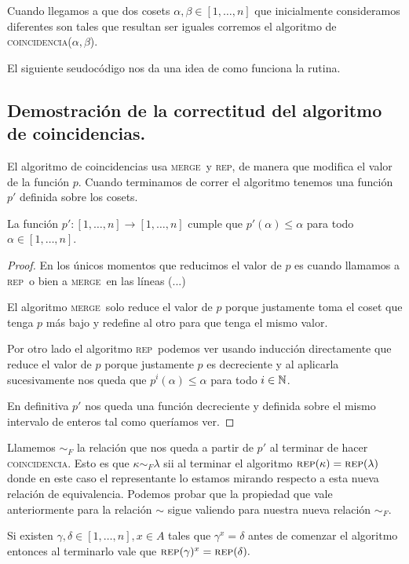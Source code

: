 \documentclass[tesis.tex]{subfiles}
\newcommand{\rep}{\textsc{rep}}
\newcommand{\coin}{\textsc{coincidencia}}
\newcommand{\mer}{\textsc{merge}}
\begin{document}
Cuando llegamos a que dos cosets $\alpha, \beta \in [1, \dots, n]$ que inicialmente consideramos diferentes  son tales que resultan ser iguales corremos el algoritmo de \coin($\alpha, \beta$).

El siguiente seudocódigo nos da una idea de como funciona la rutina.








\subsection{Demostración de la correctitud del algoritmo de coincidencias.}

El algoritmo de coincidencias usa \mer \ y \rep, de manera que modifica el valor de la función $p$.
Cuando terminamos de correr el algoritmo tenemos una función $p'$ definida sobre los cosets.

\begin{lema}
	La función $p':[1,\dots,n] \to [1,\dots,n]$ cumple que $p'(\alpha) \le \alpha$ para todo $\alpha \in [1,\dots,n]$. 
\end{lema}
\begin{proof}
	En los únicos momentos que reducimos el valor de $p$ es cuando llamamos a \rep \  o bien a \mer \ en las líneas (...)
	
	El algoritmo \mer \  solo reduce el valor de $p$ porque justamente toma el coset que tenga $p$ más bajo y redefine al otro para que tenga el mismo valor.
	
	Por otro lado el algoritmo \rep \ podemos ver usando inducción directamente que reduce el valor de $p$ porque justamente $p$ es decreciente y al aplicarla sucesivamente nos queda que $p^i(\alpha) \le \alpha$ para todo $i \in \mathbb{N}$.
	
	En definitiva $p'$ nos queda una función decreciente y definida sobre el mismo intervalo de enteros tal como queríamos ver.	
\end{proof}


Llamemos $\sim_F$ la relación que nos queda a partir de $p'$ al terminar de hacer \coin.
Esto es que $\kappa \sim_F \lambda$ sii al terminar el algoritmo $\rep (\kappa) = \rep(\lambda)$ donde en este caso el representante lo estamos mirando respecto a esta nueva relación de equivalencia.
Podemos probar que la propiedad que vale anteriormente para la relación $\sim$ sigue valiendo para nuestra nueva relación $\sim_F$.

\begin{lema}\label{lema-rep-coin}
	Si existen $\gamma, \delta \in [1,\dots,n], x \in A$ tales que $\gamma^x = \delta$ antes de comenzar el algoritmo entonces al terminarlo vale que $\rep(\gamma)^x = \rep(\delta).$
\end{lema}
\end{document}
